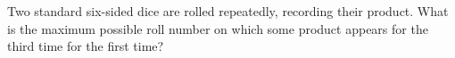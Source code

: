 Two standard six-sided dice are rolled repeatedly, recording their product. What is the maximum possible roll number on which some product appears for the third time for the first time?
